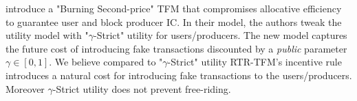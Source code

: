 \documentclass[sigconf,anonymous]{aamas}
\newcommand{\varul}[1]{\textcolor{red}{#1}}
\newcommand{\ourTFM}{\textsc{RTR-TFM}}
\renewcommand{\paragraph}[1]{\smallskip\noindent\textbf{#1}}
\begin{document}
\citet{chung2023foundations} introduce a "Burning Second-price" TFM that compromises allocative efficiency to guarantee user and block producer IC. In their model, the authors tweak the utility model with "$\gamma$-Strict" utility for users/producers. The new model captures the future cost of introducing fake transactions discounted by a \textit{public} parameter $\gamma\in [0,1]$. We believe compared to  "$\gamma$-Strict" utility \ourTFM's incentive rule introduces a natural cost for introducing fake transactions to the users/producers. Moreover $\gamma$-Strict utility does not prevent free-riding.
\end{document}
